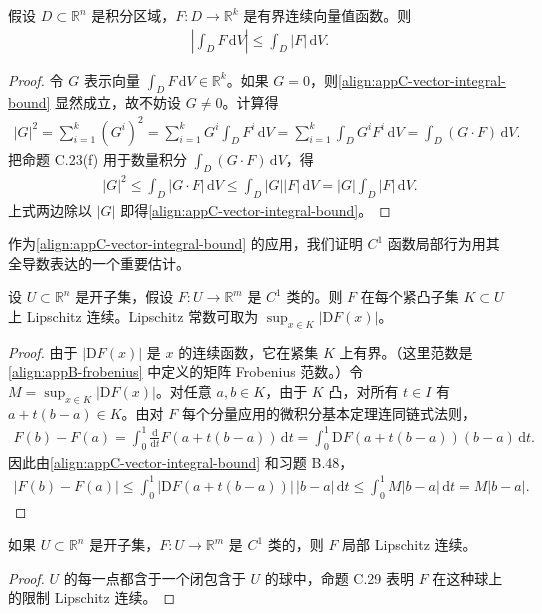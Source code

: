 \documentclass[../../main.tex]{subfiles}
\begin{document}
\begin{proposition}\label{proposition:appC-vector-integral-bound}
假设 $D\subset\mathbb R^n$ 是积分区域，$F:D\to\mathbb R^k$ 是有界连续向量值函数。则
\begin{align}\label{align:appC-vector-integral-bound}
\left|\int_D F\,\mathrm{d}V\right|\leqslant\int_D|F|\,\mathrm{d}V.
\end{align}
\end{proposition}

\begin{proof}
令 $G$ 表示向量 $\int_D F\,\mathrm{d}V\in\mathbb R^k$。如果 $G=0$，则\eqref{align:appC-vector-integral-bound} 显然成立，故不妨设 $G\neq0$。计算得
\begin{align*}
|G|^2=\sum_{i=1}^k(G^i)^2=\sum_{i=1}^k G^i\int_D F^i\,\mathrm{d}V
=\sum_{i=1}^k\int_D G^iF^i\,\mathrm{d}V=\int_D(G\cdot F)\,\mathrm{d}V.
\end{align*}
把命题 C.23(f) 用于数量积分 $\int_D(G\cdot F)\,\mathrm{d}V$，得
\begin{align*}
|G|^2\leqslant\int_D|G\cdot F|\,\mathrm{d}V\leqslant\int_D|G||F|\,\mathrm{d}V
=|G|\int_D|F|\,\mathrm{d}V.
\end{align*}
上式两边除以 $|G|$ 即得\eqref{align:appC-vector-integral-bound}。
\end{proof}

作为\eqref{align:appC-vector-integral-bound} 的应用，我们证明 $C^1$ 函数局部行为用其全导数表达的一个重要估计。

\begin{proposition}\label{proposition:appC-lipschitz}
设 $U\subset\mathbb R^n$ 是开子集，假设 $F:U\to\mathbb R^m$ 是 $C^1$ 类的。则 $F$ 在每个紧凸子集 $K\subset U$ 上 Lipschitz 连续。Lipschitz 常数可取为 $\sup_{x\in K}|\mathrm{D}F(x)|$。
\end{proposition}

\begin{proof}
由于 $|\mathrm{D}F(x)|$ 是 $x$ 的连续函数，它在紧集 $K$ 上有界。（这里范数是\eqref{align:appB-frobenius} 中定义的矩阵 Frobenius 范数。）令 $M=\sup_{x\in K}|\mathrm{D}F(x)|$。对任意 $a,b\in K$，由于 $K$ 凸，对所有 $t\in I$ 有 $a+t(b-a)\in K$。由对 $F$ 每个分量应用的微积分基本定理连同链式法则，
\begin{align*}
F(b)-F(a)=\int_0^1\frac{\mathrm{d}}{\mathrm{d}t}F(a+t(b-a))\,\mathrm{d}t
=\int_0^1\mathrm{D}F(a+t(b-a))(b-a)\,\mathrm{d}t.
\end{align*}
因此由\eqref{align:appC-vector-integral-bound} 和习题 B.48，
\begin{align*}
|F(b)-F(a)|\leqslant\int_0^1|\mathrm{D}F(a+t(b-a))|\,|b-a|\,\mathrm{d}t
\leqslant\int_0^1 M|b-a|\,\mathrm{d}t=M|b-a|.
\end{align*}
\end{proof}

\begin{corollary}\label{corollary:appC-local-lipschitz}
如果 $U\subset\mathbb R^n$ 是开子集，$F:U\to\mathbb R^m$ 是 $C^1$ 类的，则 $F$ 局部 Lipschitz 连续。
\end{corollary}

\begin{proof}
$U$ 的每一点都含于一个闭包含于 $U$ 的球中，命题 C.29 表明 $F$ 在这种球上的限制 Lipschitz 连续。
\end{proof}
\end{document}
